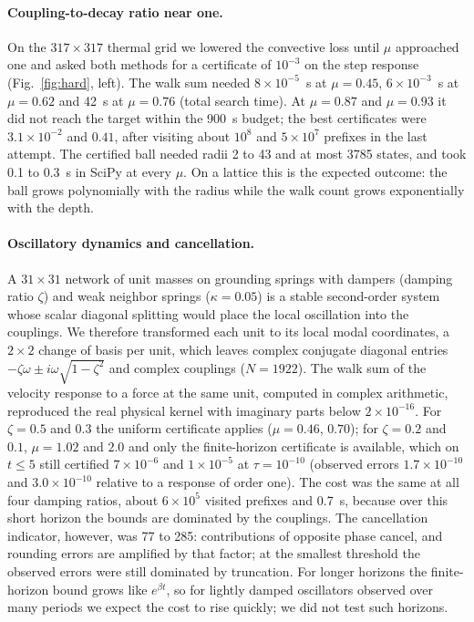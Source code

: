\paragraph*{Coupling-to-decay ratio near one.} On the $317\times317$ thermal grid we lowered the convective loss until $\mu$ approached one and asked both methods for a certificate of $10^{-3}$ on the step response (Fig.~\ref{fig:hard}, left). The walk sum needed $8\times10^{-5}$~s at $\mu=0.45$, $6\times10^{-3}$~s at $\mu=0.62$ and 42~s at $\mu=0.76$ (total search time). At $\mu=0.87$ and $\mu=0.93$ it did not reach the target within the 900~s budget; the best certificates were $3.1\times10^{-2}$ and $0.41$, after visiting about $10^8$ and $5\times10^7$ prefixes in the last attempt. The certified ball needed radii 2 to 43 and at most 3785 states, and took 0.1 to 0.3~s in SciPy at every $\mu$. On a lattice this is the expected outcome: the ball grows polynomially with the radius while the walk count grows exponentially with the depth.

\paragraph*{Oscillatory dynamics and cancellation.} A $31\times31$ network of unit masses on grounding springs with dampers (damping ratio $\zeta$) and weak neighbor springs ($\kappa=0.05$) is a stable second-order system whose scalar diagonal splitting would place the local oscillation into the couplings. We therefore transformed each unit to its local modal coordinates, a $2\times2$ change of basis per unit, which leaves complex conjugate diagonal entries $-\zeta\omega\pm i\omega\sqrt{1-\zeta^2}$ and complex couplings ($N=1922$). The walk sum of the velocity response to a force at the same unit, computed in complex arithmetic, reproduced the real physical kernel with imaginary parts below $2\times10^{-16}$. For $\zeta=0.5$ and $0.3$ the uniform certificate applies ($\mu=0.46$, $0.70$); for $\zeta=0.2$ and $0.1$, $\mu=1.02$ and $2.0$ and only the finite-horizon certificate is available, which on $t\le5$ still certified $7\times10^{-6}$ and $1\times10^{-5}$ at $\tau=10^{-10}$ (observed errors $1.7\times10^{-10}$ and $3.0\times10^{-10}$ relative to a response of order one). The cost was the same at all four damping ratios, about $6\times10^5$ visited prefixes and 0.7~s, because over this short horizon the bounds are dominated by the couplings. The cancellation indicator, however, was 77 to 285: contributions of opposite phase cancel, and rounding errors are amplified by that factor; at the smallest threshold the observed errors were still dominated by truncation. For longer horizons the finite-horizon bound grows like $e^{\beta t}$, so for lightly damped oscillators observed over many periods we expect the cost to rise quickly; we did not test such horizons.

